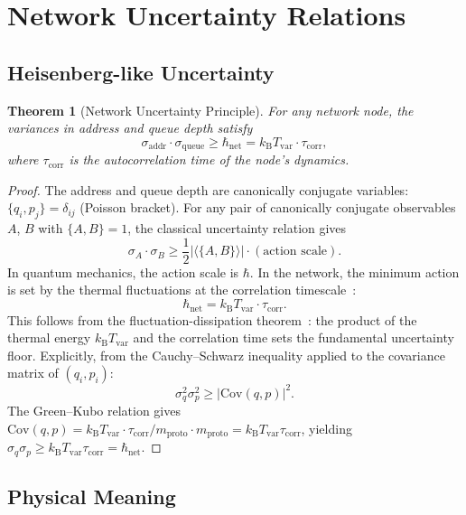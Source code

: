 \documentclass[11pt,twocolumn,a4paper]{article}
\newtheorem{theorem}{Theorem}[section]
\theoremstyle{definition}
\theoremstyle{remark}
\newcommand{\kB}{k_{\mathrm{B}}}
\newcommand{\Tvar}{T_{\mathrm{var}}}
\newcommand{\mpr}{m_{\mathrm{proto}}}
\newcommand{\hnet}{\hbar_{\mathrm{net}}}
\newcommand{\avg}[1]{\langle #1 \rangle}
\begin{document}
\section{Network Uncertainty Relations}\label{sec:uncertainty}

\subsection{Heisenberg-like Uncertainty}\label{sec:heisenberg}

\begin{theorem}[Network Uncertainty Principle]\label{thm:uncertainty}
For any network node, the variances in address and queue depth satisfy
\begin{equation}\label{eq:uncertainty}
  \sigma_{\mathrm{addr}}\cdot\sigma_{\mathrm{queue}}
  \geq \hnet = \kB\Tvar\cdot\tau_{\mathrm{corr}},
\end{equation}
where $\tau_{\mathrm{corr}}$ is the autocorrelation time of the node's dynamics.
\end{theorem}

\begin{proof}
The address and queue depth are canonically conjugate variables:
$\{q_i,p_j\}=\delta_{ij}$ (Poisson bracket).  For any pair of canonically
conjugate observables $A$, $B$ with $\{A,B\}=1$, the classical uncertainty
relation gives~\cite{Goldstein2002}
\[
  \sigma_A\cdot\sigma_B \geq \frac{1}{2}|\avg{\{A,B\}}|\cdot(\text{action scale}).
\]
In quantum mechanics, the action scale is $\hbar$.  In the network, the
minimum action is set by the thermal fluctuations at the correlation
timescale~\cite{Heisenberg1927}:
\[
  \hnet = \kB\Tvar\cdot\tau_{\mathrm{corr}}.
\]
This follows from the fluctuation-dissipation theorem~\cite{Kubo1957}: the
product of the thermal energy $\kB\Tvar$ and the correlation time sets the
fundamental uncertainty floor.  Explicitly, from the Cauchy--Schwarz
inequality applied to the covariance matrix of $(q_i,p_i)$:
\[
  \sigma_q^2\sigma_p^2 \geq |\mathrm{Cov}(q,p)|^2.
\]
The Green--Kubo relation gives~\cite{Green1954}
$\mathrm{Cov}(q,p)=\kB\Tvar\cdot\tau_{\mathrm{corr}}/\mpr\cdot\mpr
=\kB\Tvar\tau_{\mathrm{corr}}$, yielding
$\sigma_q\sigma_p\geq\kB\Tvar\tau_{\mathrm{corr}}=\hnet$.
\end{proof}

\subsection{Physical Meaning}\label{sec:uncertainty_meaning}
\end{document}
